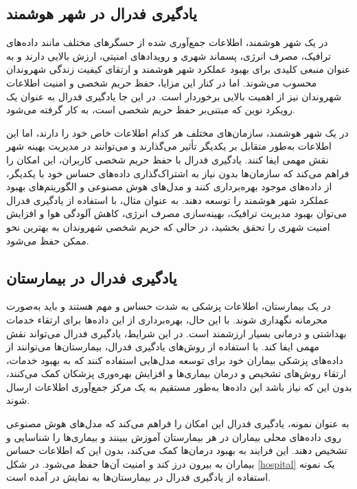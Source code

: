 \subsection{
	یادگیری فدرال در شهر هوشمند%
}
در یک شهر هوشمند، اطلاعات جمع‌آوری شده از حسگرهای مختلف مانند داده‌های ترافیک، مصرف انرژی، پسماند شهری و رویدادهای امنیتی، ارزش بالایی دارند و به عنوان منبعی کلیدی برای بهبود عملکرد شهر هوشمند و ارتقای کیفیت زندگی شهروندان محسوب می‌شوند. اما در کنار این مزایا، حفظ حریم شخصی و امنیت اطلاعات شهروندان نیز از اهمیت بالایی برخوردار است. در این جا یادگیری فدرال به عنوان یک رویکرد نوین که مبتنی‌بر حفظ حریم شخصی است، به کار گرفته می‌شود.

در یک شهر هوشمند، سازمان‌های مختلف هر کدام اطلاعات خاص خود را دارند، اما این اطلاعات به‌طور متقابل بر یکدیگر تأثیر می‌گذارند و می‌توانند در مدیریت بهینه شهر نقش مهمی ایفا کنند. یادگیری فدرال با حفظ حریم شخصی کاربران، این امکان را فراهم می‌کند که سازمان‌ها بدون نیاز به اشتراک‌گذاری داده‌های حساس خود با یکدیگر، از داده‌های موجود بهره‌برداری کنند و مدل‌های هوش مصنوعی و الگوریتم‌های بهبود عملکرد شهر هوشمند را توسعه دهند. به عنوان مثال، با استفاده از یادگیری فدرال می‌توان بهبود مدیریت ترافیک، بهینه‌سازی مصرف انرژی، کاهش آلودگی هوا و افزایش امنیت شهری را تحقق بخشید، در حالی که حریم شخصی شهروندان به بهترین نحو ممکن حفظ می‌شود.


\subsection{یادگیری فدرال در بیمارستان}
در یک بیمارستان، اطلاعات پزشکی به شدت حساس و مهم هستند و باید به‌صورت محرمانه نگهداری شوند. با این حال، بهره‌برداری از این داده‌ها برای ارتقاء خدمات بهداشتی و درمانی بسیار ارزشمند است. در این شرایط، یادگیری فدرال می‌تواند نقش مهمی ایفا کند. با استفاده از روش‌های یادگیری فدرال، بیمارستان‌ها می‌توانند از داده‌های پزشکی بیماران خود برای توسعه مدل‌هایی استفاده کنند که به بهبود خدمات، ارتقاء روش‌های تشخیص و درمان بیماری‌ها و افزایش بهره‌وری پزشکان کمک می‌کنند، بدون این که نیاز باشد این داده‌ها به‌طور مستقیم به یک مرکز جمع‌آوری اطلاعات ارسال شوند.

به عنوان نمونه، یادگیری فدرال این امکان را فراهم می‌کند که مدل‌های هوش مصنوعی روی داده‌های محلی بیماران در هر بیمارستان آموزش ببینند و بیماری‌ها را شناسایی و تشخیص دهند. این فرایند به بهبود درمان‌ها کمک می‌کند، بدون این که اطلاعات حساس بیماران به بیرون درز کند و امنیت آن‌ها حفظ می‌شود. در شکل
\ref{hospital}
یک نمونه استفاده از یادگیری فدرال در بیمارستان‌ها به نمایش در آمده است.


